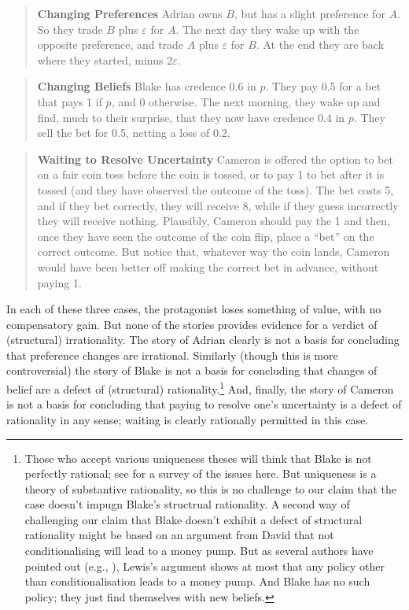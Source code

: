 \documentclass[
  11pt,
  letterpaper]{article}
\begin{document}
\begin{quote} \textbf{Changing Preferences} Adrian owns $B$, but has a slight preference for $A$. So they trade $B$ plus $\varepsilon$ for $A$. The next day they wake up with the opposite preference, and trade $A$ plus $\varepsilon$ for $B$. At the end they are back where they started, minus 2$\varepsilon$. \end{quote}

\begin{quote} \textbf{Changing Beliefs} Blake has credence 0.6 in $p$. They pay 0.5 for a bet that pays 1 if $p$, and 0 otherwise. The next morning, they wake up and find, much to their surprise, that they now have credence 0.4 in $p$. They sell the bet for 0.5, netting a loss of 0.2. \end{quote}

\begin{quote} \textbf{Waiting to Resolve Uncertainty} Cameron is offered the option to bet on a fair coin toss before the coin is tossed, or to pay 1 to bet after it is tossed (and they have observed the outcome of the toss). The bet costs 5, and if they bet correctly, they will receive 8, while if they guess incorrectly they will receive nothing. Plausibly, Cameron should pay the 1 and then, once they have seen the outcome of the coin flip, place a ``bet'' on the correct outcome. But notice that, whatever way the coin lands, Cameron would have been better off making the correct bet in advance, without paying 1. \end{quote}

In each of these three cases, the protagonist loses something of value, with no compensatory gain. But none of the stories provides evidence for a verdict of (structural) irrationality. The story of Adrian clearly is not a basis for concluding that preference changes are irrational. Similarly (though this is more controversial) the story of Blake is not a basis for concluding that changes of belief are a defect of (structural) rationality.\footnote{Those who accept various uniqueness theses will think  that Blake is not perfectly rational; see \citet{KopecTitelbaum2016} for a survey of the issues here. But uniqueness is a theory of substantive rationality, so this is no challenge to our claim that the case doesn't impugn Blake's structrual rationality. A second way of challenging our claim that Blake doesn't exhibit a defect of structural rationality might be based on an argument from David \citet{Lewis1999} that not conditionalising will lead to a money pump. But as several authors have pointed out (e.g., \citet{Bradley2005}), Lewis's argument shows at most that any policy other than conditionalisation leads to a money pump. And Blake has no such policy; they just find themselves with new beliefs.} And, finally, the story of Cameron is not a basis for concluding that paying to resolve one's uncertainty is a defect of rationality in any sense; waiting is clearly rationally permitted in this case.
\end{document}
